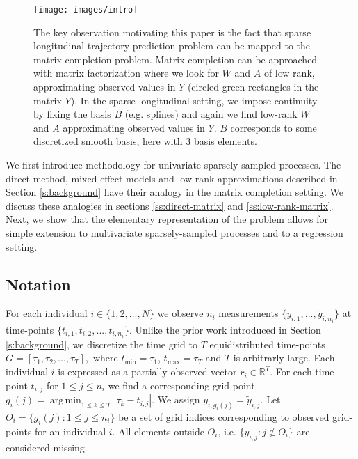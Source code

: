 \documentclass[preprint]{imsart}
\numberwithin{equation}{section}
\theoremstyle{plain}
\newcommand{\R}{\mathbb{R}}
\DeclareMathOperator*{\argmin}{arg\,min}
\begin{document}
\begin{figure}[h]
  \texttt{[image: images/intro]}
  \caption{The key observation motivating this paper is the fact that sparse longitudinal trajectory prediction problem can be mapped to the matrix completion problem. Matrix completion can be approached with matrix factorization where we look for $W$ and $A$ of low rank, approximating observed values in $Y$ (circled green rectangles in the matrix $Y$). In the sparse longitudinal setting, we impose continuity by fixing the basis $B$ (e.g. splines) and again we find low-rank $W$ and $A$ approximating observed values in $Y$. $B$ corresponds to some discretized smooth basis, here with $3$ basis elements.}
  \label{fig:idea}
\end{figure}

We first introduce methodology for univariate sparsely-sampled processes. The direct method, mixed-effect models and low-rank approximations described in Section \ref{s:background} have their analogy in the matrix completion setting. We discuss these analogies in sections \ref{ss:direct-matrix} and \ref{ss:low-rank-matrix}. Next, we show that the elementary representation of the problem allows for simple extension to multivariate sparsely-sampled processes and to a regression setting.

\subsection{Notation}


For each individual $i \in \{1,2,...,N\}$ we observe $n_i$ measurements $\{\tilde y_{i,1},...,\tilde y_{i,n_i}\}$ at time-points $\{t_{i,1},t_{i,2},...,t_{i,n_i}\}$. Unlike the prior work introduced in Section \ref{s:background}, we discretize the time grid to $T$ equidistributed time-points $G = \left[\tau_1, \tau_2, ..., \tau_T\right],$ where $t_{\min} = \tau_1$, $t_{\max} = \tau_T$ and $T$ is arbitrarly large. Each individual $i$ is expressed as a partially observed vector $r_i \in \R^T$. For each time-point $t_{i,j}$ for $1 \leq j \leq n_i$ we find a corresponding grid-point $g_i(j) = \argmin_{1 \leq k \leq T}  |\tau_k - t_{i,j}|$. We assign $y_{i,g_i(j)} = \tilde y_{i,j}$. Let $O_i = \{g_i(j): 1 \leq j \leq n_i \}$ be a set of grid indices corresponding to observed grid-points for an individual $i$. All elements outside $O_i$, i.e. $\{y_{i,j} : j \notin O_i\}$ are considered missing.
\end{document}
